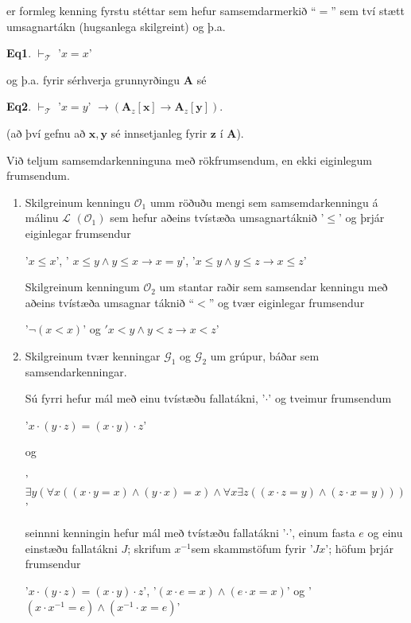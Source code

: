 \documentclass[12pt]{article}
\begin{document}
\begin{skgr} er formleg kenning fyrstu stéttar sem hefur
  samsemdarmerkið ``$=$'' sem tví stætt umsagnartákn (hugsanlega skilgreint) og
  þ.a.


  \textbf{Eq1}. $\vdash_{\mathcal{T}}$ '$x = x$'

  og þ.a. fyrir sérhverja grunnyrðingu $\mathbf{A}$ sé


 \textbf{Eq2}. $\vdash_{\mathcal{T}}$ '$x = y$' $\rightarrow ( \mathbf{A}_z[\mathbf{x}] \rightarrow \mathbf{A}_z[\mathbf{y}])$.

  (að því gefnu að $\mathbf{x}, \mathbf{y}$ sé innsetjanleg fyrir $\mathbf{z}$ í $\mathbf{A}$).

  Við teljum samsemdarkenninguna með rökfrumsendum, en ekki eiginlegum frumsendum.
\end{skgr}

\begin{daemi}
  \begin{enumerate}[(1)]
  \item Skilgreinum kenningu $\mathcal{O}_1$ umm röðuðu mengi
    sem samsemdarkenningu á málinu $\mathcal{L}$ $(\mathcal{O}_{1})$ sem hefur aðeins
    tvístæða umsagnartáknið '$\leq$' og þrjár eiginlegar frumsendur


    '$x \leq x$', ' $x \leq y \wedge y \leq x \rightarrow x = y$', '$x \leq y \wedge y \leq z \rightarrow x \leq z$'

    Skilgreinum kenningum $\mathcal{O}_2$ um stantar raðir sem samsendar kenningu
    með aðeins tvístæða umsagnar táknið ``$<$'' og tvær eiginlegar frumsendur


    '$\lnot (x < x)$' og $' x < y \wedge y < z \rightarrow x < z$'

  \item
    Skilgreinum tvær kenningar $\mathcal{G}_1$ og $\mathcal{G}_2$ um grúpur,
    báðar sem samsendarkenningar.

    Sú fyrri hefur mál með einu tvístæðu fallatákni,
    '$\cdot$' og tveimur frumsendum


    '$x \cdot (y \cdot z) = (x \cdot y) \cdot z$'

    og

    '$\exists y (\forall x (( x \cdot y = x) \wedge (y \cdot x) = x) \wedge \forall x \exists z ((x \cdot z = y) \wedge (z \cdot x = y)))$'

    seinnni kenningin hefur mál með tvístæðu fallatákni '$\cdot$', einum
    fasta $e$ og einu einstæðu fallatákni $J$; skrifum $x^{-1}$sem skammstöfum fyrir '$Jx$'; höfum þrjár frumsendur

    '$x \cdot (y \cdot z) = (x \cdot y) \cdot z$', '$(x \cdot e = x) \wedge ( e \cdot x = x)$' og '$(x\cdot x^{-1} = e) \wedge (x^{-1} \cdot x = e)$'
  \end{enumerate}


\end{daemi}
\end{document}
